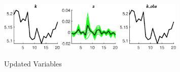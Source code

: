  
\begin{figure}[H]
\centering 
\includegraphics[width=0.80\textwidth]{RBC_kz/Output/RBC_kz_UpdatedVariables_k_obs}
\label{Fig:UpdatedVariables:k_obs}
\caption{Updated Variables}
\end{figure}
 
